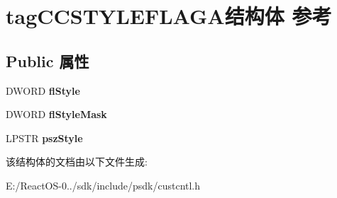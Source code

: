 \hypertarget{structtag_c_c_s_t_y_l_e_f_l_a_g_a}{}\section{tag\+C\+C\+S\+T\+Y\+L\+E\+F\+L\+A\+G\+A结构体 参考}
\label{structtag_c_c_s_t_y_l_e_f_l_a_g_a}
\subsection*{Public 属性}
\begin{DoxyCompactItemize}
\item 
\mbox{\label{structtag_c_c_s_t_y_l_e_f_l_a_g_a_aaffd8e35a8249f280e8c9b07d6ca7267}} 
D\+W\+O\+RD {\bfseries fl\+Style}
\item 
\mbox{\label{structtag_c_c_s_t_y_l_e_f_l_a_g_a_af984b4c717f94e057b5f5d3e7e234b20}} 
D\+W\+O\+RD {\bfseries fl\+Style\+Mask}
\item 
\mbox{\label{structtag_c_c_s_t_y_l_e_f_l_a_g_a_a09a26a427b5c07a99a236f204ad28ef7}} 
L\+P\+S\+TR {\bfseries psz\+Style}
\end{DoxyCompactItemize}


该结构体的文档由以下文件生成\+:\begin{DoxyCompactItemize}
\item 
E\+:/\+React\+O\+S-\/0../sdk/include/psdk/custcntl.\+h\end{DoxyCompactItemize}
